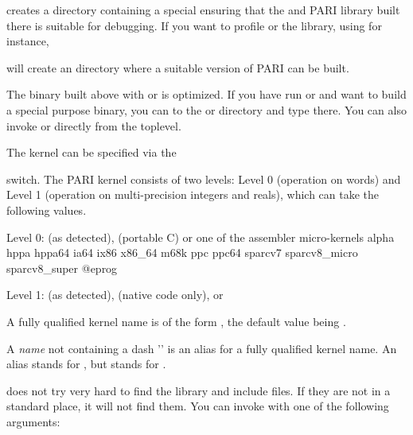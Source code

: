 \noindent creates a directory  containing a special
 ensuring that the  and PARI library built there is
suitable for debugging. If you want to
profile  or the library, using  for instance,


\noindent will create an  directory where a suitable version
of PARI can be built.

The  binary built above with  or  is
optimized. If you have run  or  and want to build
a special purpose binary, you can  to the  or 
directory and type  there. You can also invoke 
or  directly from the toplevel.

 The kernel can be specified via the


\noindent switch. The PARI kernel consists of two levels: Level 0 (operation
on words) and Level 1 (operation on multi-precision integers and reals),
which can take the following values.

Level 0:  (as detected),  (portable C) or
one of the assembler micro-kernels
\bprog
  alpha
  hppa hppa64
  ia64
  ix86 x86_64
  m68k
  ppc ppc64
  sparcv7 sparcv8_micro sparcv8_super
@eprog

Level 1:  (as detected),  (native code only), or 

\noindent\item A fully qualified kernel name is of the form
, the default value being .

\noindent\item A \emph{name} not containing a dash '\kbd{-}' is an alias
for a fully qualified kernel name. An alias stands for
, but  stands for .

 does not try very hard to find the  library and
include files. If they are not in a standard place, it will not find them.
You can invoke  with one of the following arguments:


